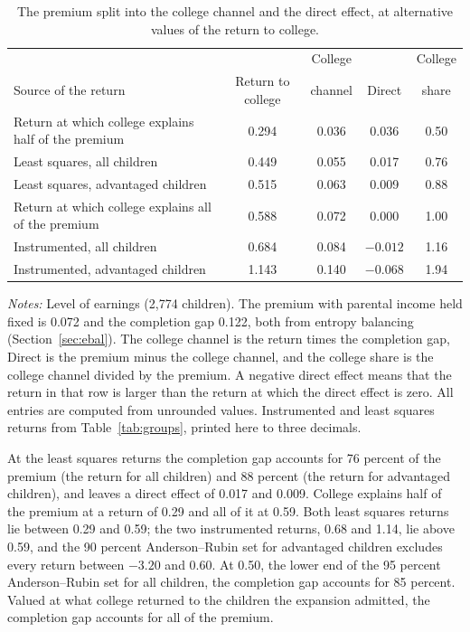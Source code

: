 \documentclass[11pt]{article}
\begin{document}
\begin{table}[t]
\centering
\small
\caption{The premium split into the college channel and the direct
effect, at alternative values of the return to college.}
\label{tab:bounds}
\setlength{\tabcolsep}{4pt}
\begin{tabular}{@{}lcccc@{}}
\toprule
& & College & & College \\
Source of the return & Return to college & channel & Direct & share \\
\midrule
Return at which college explains half of the premium & 0.294 & 0.036 & 0.036 & 0.50 \\
Least squares, all children & 0.449 & 0.055 & 0.017 & 0.76 \\
Least squares, advantaged children & 0.515 & 0.063 & 0.009 & 0.88 \\
Return at which college explains all of the premium & 0.588 & 0.072 & 0.000 & 1.00 \\
Instrumented, all children & 0.684 & 0.084 & $-0.012$ & 1.16 \\
Instrumented, advantaged children & 1.143 & 0.140 & $-0.068$ & 1.94 \\
\bottomrule
\end{tabular}
\par\smallskip
\begin{minipage}{0.9\textwidth}
\footnotesize\emph{Notes:} Level of earnings (2,774 children). The premium with parental income held fixed is 0.072 and the completion gap 0.122, both from entropy balancing
(Section~\ref{sec:ebal}). The college channel is the return times the
completion gap, Direct is the premium minus the
college channel, and the college share is the college channel divided
by the premium. A negative
direct effect means that the return in that row is larger than the
return at which the direct effect is zero. All entries are computed from unrounded values. Instrumented and least squares returns from Table~\ref{tab:groups}, printed here to three decimals.
\end{minipage}
\end{table}

At the least squares returns the completion gap accounts for 76 percent of the premium (the return for all children) and 88 percent (the return for advantaged children), and leaves a direct effect of 0.017 and 0.009. College explains half of the premium at a return of 0.29 and all of it at 0.59. Both least squares returns lie between 0.29 and 0.59; the two instrumented returns, 0.68 and 1.14, lie above 0.59, and the 90 percent Anderson--Rubin set for advantaged children excludes every return between $-3.20$ and 0.60. At 0.50, the lower end of the 95 percent Anderson--Rubin set for all children, the completion gap accounts for 85 percent. Valued at what college returned to the children the expansion admitted, the completion gap accounts for all of the premium.
\end{document}
